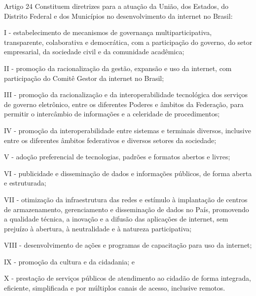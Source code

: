 \begin{frame}{Artigo 24}
Constituem diretrizes para a atuação da União, dos Estados, do Distrito Federal e dos Municípios no desenvolvimento da internet no Brasil:

I - estabelecimento de mecanismos de governança multiparticipativa, transparente, colaborativa e democrática, com a participação do governo, do setor empresarial, da sociedade civil e da comunidade acadêmica;

II - promoção da racionalização da gestão, expansão e uso da internet, com participação do Comitê Gestor da internet no Brasil;

III - promoção da racionalização e da interoperabilidade tecnológica dos serviços de governo eletrônico, entre os diferentes Poderes e âmbitos da Federação, para permitir o intercâmbio de informações e a celeridade de procedimentos;

IV - promoção da interoperabilidade entre sistemas e terminais diversos, inclusive entre os diferentes âmbitos federativos e diversos setores da sociedade;

V - adoção preferencial de tecnologias, padrões e formatos abertos e livres;

VI - publicidade e disseminação de dados e informações públicos, de forma aberta e estruturada;

VII - otimização da infraestrutura das redes e estímulo à implantação de centros de armazenamento, gerenciamento e disseminação de dados no País, promovendo a qualidade técnica, a inovação e a difusão das aplicações de internet, sem prejuízo à abertura, à neutralidade e à natureza participativa;

VIII - desenvolvimento de ações e programas de capacitação para uso da internet;

IX - promoção da cultura e da cidadania; e

X - prestação de serviços públicos de atendimento ao cidadão de forma integrada, eficiente, simplificada e por múltiplos canais de acesso, inclusive remotos.
\end{frame}